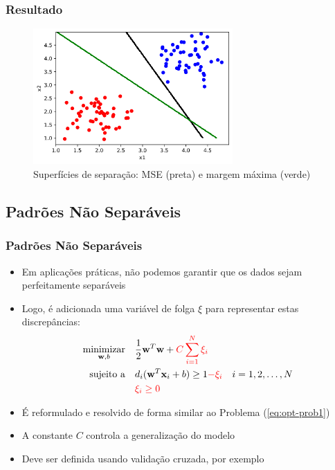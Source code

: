 \documentclass{beamer}
\begin{document}
\begin{frame}
	\frametitle{Resultado}
	\begin{figure}[h!]
		\centering
		\includegraphics[width=3in]{fig02.png}
		\caption{Superfícies de separação: MSE (preta) e margem máxima (verde)}
		\label{fig:opt-margin-ds}
	\end{figure}
\end{frame}

\subsection{Padrões Não Separáveis}
\begin{frame}
	\frametitle{Padrões Não Separáveis}
	\begin{itemize}
		\item Em aplicações práticas, não podemos garantir que os dados sejam perfeitamente separáveis
		\item Logo, é adicionada uma variável de folga $\xi$ para representar estas discrepâncias:
		\begin{align}
			\underset{\textbf{w},b}{\text{minimizar}} \quad & \frac{1}{2}\textbf{w}^T\textbf{w} + \textcolor{red}{C\sum_{i=1}^{N}\xi_i} \\ 
			\text{sujeito a} \quad & d_i(\textbf{w}^T\textbf{x}_i + b) \geq 1 \textcolor{red}{- \xi_i} \quad i=1,2,\dots,N   \nonumber \\
			& \textcolor{red}{\xi_i \geq 0} \nonumber
		\end{align} 
		\item É reformulado e resolvido de forma similar ao Problema (\ref{eq:opt-prob1})
		\item A constante $C$ controla a generalização do modelo
		\item Deve ser definida usando validação cruzada, por exemplo
	\end{itemize}
	
\end{frame}
\end{document}
